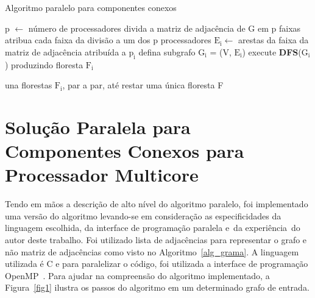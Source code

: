 \documentclass[12pt]{article}
\begin{document}
\begin{algorithm}[htp!]
    \DontPrintSemicolon
    \newcommand\mycommfont[1]{\small\ttfamily{#1}}
    \caption{Algoritmo paralelo para componentes conexos}
    \label{alg_grama}
    {
        p $\gets$ número de processadores\;
        divida a matriz de adjacência de G em p faixas\;
        atribua cada faixa da divisão a um dos p processadores\;
        {
            $\text{E}_\text{i} \gets$ arestas da faixa da matriz de adjacência atribuída a $\text{p}_\text{i}$\;
            defina subgrafo $\text{G}_\text{i}$ = (V, $\text{E}_\text{i}$)\;
            execute \textbf{DFS}($\text{G}_\text{i}$) produzindo floresta $\text{F}_\text{i}$\;
        }

        una florestas $\text{F}_\text{i}$, par a par, até restar uma única floresta F\;
        
    }
\end{algorithm}

\section{Solução Paralela para Componentes Conexos para Processador Multicore}
Tendo em mãos a descrição de alto nível do algoritmo paralelo, foi implementado uma versão do algoritmo levando-se em consideração as especificidades da linguagem escolhida, da interface de programação paralela e da experiência do autor deste trabalho. Foi utilizado lista de adjacências para representar o grafo e não matriz de adjacências como visto no Algoritmo~\ref{alg_grama}. A linguagem utilizada é C e para paralelizar o código, foi utilizada a interface de programação OpenMP~\cite{OpenMP:2018}. Para ajudar na compreensão do algoritmo implementado, a Figura~\ref{fig1} ilustra os passos do algoritmo em um determinado grafo de entrada.
\end{document}
